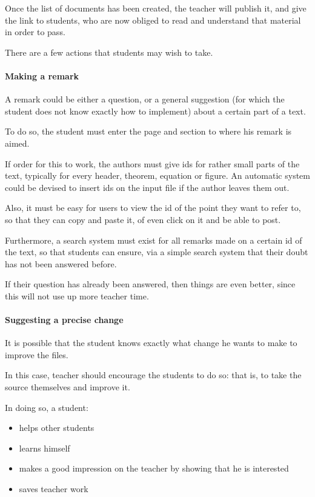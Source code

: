 \documentclass[12pt]{article}
\begin{document}
Once the list of documents has been created, the teacher will publish it, and give the link to students, who are now obliged to read and understand that material in order to pass.

There are a few actions that students may wish to take.

\paragraph{Making a remark} \label{make-a-remark}

A remark could be either a question, or a general suggestion (for which the student does not know exactly how to implement) about a certain part of a text.  
  
To do so, the student must enter the page and section to where his remark is aimed.
  
If order for this to work, the authors must give ids for rather small parts of the text, typically for every header, theorem, equation or figure. An automatic system could be devised to insert ids on the input file if the author leaves them out.
  
Also, it must be easy for users to view the id of the point they want to refer to, so that they can copy and paste it, of even click on it and be able to post.
  
Furthermore, a search system must exist for all remarks made on a certain id of the text, so that students can ensure, via a simple search system that their doubt has not been answered before.
  
If their question has already been answered, then things are even better, since this will not use up more teacher time. 
  
\paragraph{Suggesting a precise change} \label{suggesting-a-precise-change}

It is possible that the student knows exactly what change he wants to make to improve the files.

In this case, teacher should encourage the students to do so: that is, to take the source themselves and improve it.

In doing so, a student:

\begin{itemize}
  \item helps other students
  \item learns himself
  \item makes a good impression on the teacher by showing that he is interested
  \item saves teacher work
\end{itemize}
\end{document}
